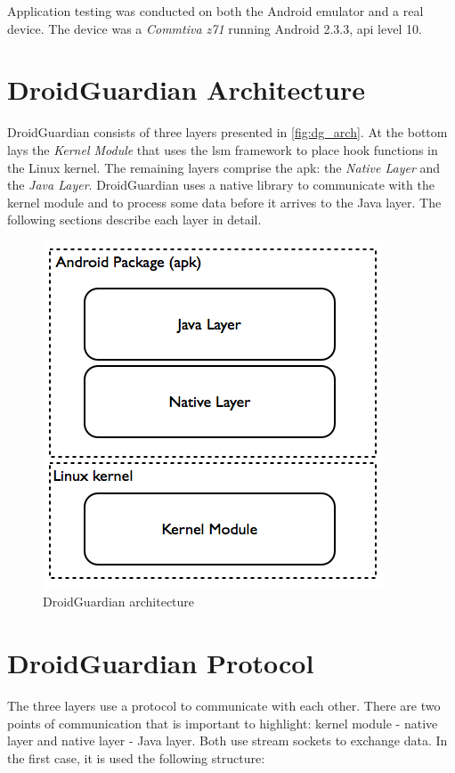 Application testing was conducted on both the Android emulator and a real device. The device was a \textit{Commtiva z71} running Android 2.3.3, \gls{api} level 10.

\section{DroidGuardian Architecture}

DroidGuardian consists of three layers presented in \autoref{fig:dg_arch}. At the bottom lays the \textit{Kernel Module} that uses the \gls{lsm} framework to place hook functions in the Linux kernel. The remaining layers comprise the \gls{apk}: the \textit{Native Layer} and the \textit{Java Layer}. DroidGuardian uses a native library to communicate with the kernel module and to process some data before it arrives to the Java layer. The following sections describe each layer in detail.

\begin{figure}[h]
 \centering
 \includegraphics[scale=0.5]{figures/dg_arch.png}
 \caption{DroidGuardian architecture}
 \label{fig:dg_arch}
\end{figure}

\section{DroidGuardian Protocol}

The three layers use a protocol to communicate with each other. There are two points of communication that is important to highlight: kernel module - native layer and native layer - Java layer. Both use stream sockets to exchange data. In the first case, it is used the following structure:

